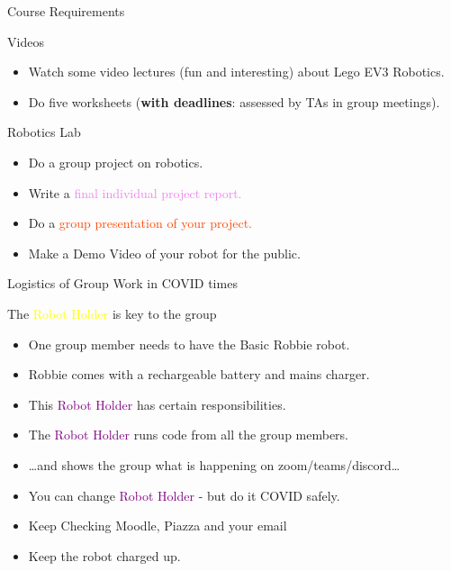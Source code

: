 \documentclass[color=pdftex,usenames,dvipsnames, aspectratio=169]{beamer}
\begin{document}
\begin{frame}{Course Requirements}
\begin{block}{Videos}
\begin{itemize}
\item Watch some video lectures (fun and interesting) about Lego EV3 Robotics.
\item Do five worksheets (\textbf{with deadlines}: assessed by TAs in group meetings).
\end{itemize}
\end{block}

\begin{block}{Robotics Lab}
\begin{itemize}
\item Do a \alert{group project} on robotics.
\item Write a \textcolor{violet}{final individual project report.}
\item Do a \textcolor{OrangeRed}{group presentation of your project.}
\item \textcolor{OliveGreen}{Make a Demo Video of your robot for the public.}
\end{itemize}
\end{block}
\end{frame}

\begin{frame}{Logistics of Group Work in COVID times}

\begin{block}{The \textcolor{yellow}{Robot Holder} is key to the group}
\begin{itemize}
  \item One group member needs to have the \textcolor{OliveGreen}{Basic Robbie} robot.
  \item \textcolor{OliveGreen}{Robbie} comes with a rechargeable battery and mains charger.
  \item This \textcolor{purple}{Robot Holder} has certain responsibilities.
  \item The \textcolor{purple}{Robot Holder} runs code from all the group members.
  \item \dots and shows the group what is happening on zoom/teams/discord\dots
  \item You can change \textcolor{purple}{Robot Holder} - but do it COVID safely.
  \item \alert{Keep Checking Moodle, Piazza and your email}
  \item Keep the robot charged up.
\end{itemize}
\end{block}
\end{frame}
\end{document}

